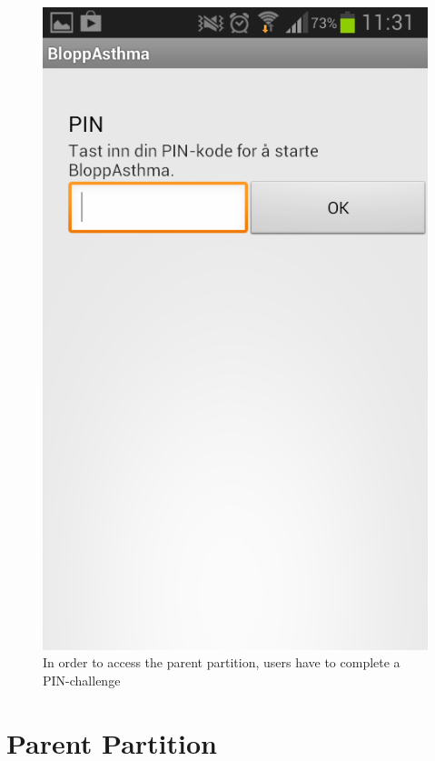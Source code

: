 \begin{figure}
\begin{minipage}[t]{0.4\linewidth}
			\includegraphics[width=0.20\paperwidth]{Pictures/new-screenshots/pin-challenge.png}
		\caption{In order to access the parent partition, users have to complete a PIN-challenge}
		\label{fig:parent-pin}
	\end{minipage}
\end{figure}

\section{Parent Partition}
\label{sec:parentpartition}

